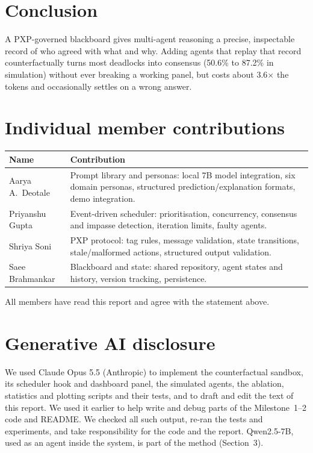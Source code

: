 \documentclass[11pt,a4paper,twocolumn]{article}
\begin{document}
\section{Conclusion}
A PXP-governed blackboard gives multi-agent reasoning a precise, inspectable record of
who agreed with what and why. Adding agents that replay that record counterfactually
turns most deadlocks into consensus (50.6\% to 87.2\% in simulation) without ever
breaking a working panel, but costs about 3.6$\times$ the tokens and occasionally settles
on a wrong answer.

\section*{Individual member contributions}
{\small
\begin{tabularx}{\linewidth}{@{}l X@{}}
\toprule
Name & Contribution \\
\midrule
Aarya A.\ Deotale & Prompt library and personas: local 7B model integration, six
domain personas, structured prediction/explanation formats, demo integration. \\
Priyanshu Gupta & Event-driven scheduler: prioritisation, concurrency, consensus and
impasse detection, iteration limits, faulty agents. \\
Shriya Soni & PXP protocol: tag rules, message validation, state transitions,
stale/malformed actions, structured output validation. \\
Saee Brahmankar & Blackboard and state: shared repository, agent states and history,
version tracking, persistence. \\
\bottomrule
\end{tabularx}}

\smallskip
\noindent All members have read this report and agree with the statement above.

\section*{Generative AI disclosure}
We used Claude Opus 5.5 (Anthropic) to implement the counterfactual sandbox, its
scheduler hook and dashboard panel, the simulated agents, the ablation, statistics and
plotting scripts and their tests, and to draft and edit the text of this report. We
used it earlier to help write and debug parts of the Milestone~1--2 code and README.
We checked all such output, re-ran the tests and experiments, and take responsibility for
the code and the report. Qwen2.5-7B, used as an agent inside the system, is part of the
method (Section~3).
\end{document}
